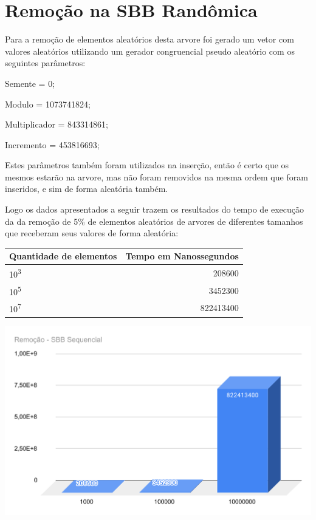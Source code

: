 \section{Remoção na SBB Randômica}

Para a remoção de elementos aleatórios desta arvore foi gerado um vetor com valores aleatórios utilizando um gerador congruencial pseudo aleatório com os seguintes parâmetros:
        \begin{center}
        Semente = 0;
       
        Modulo = 1073741824;
       
        Multiplicador = 843314861;
       
        Incremento = 453816693;
        \end{center}

Estes parâmetros também foram utilizados na inserção, então é certo que os mesmos estarão na arvore, mas não foram removidos na mesma ordem que foram inseridos, e sim de forma aleatória também.

Logo os dados apresentados a seguir trazem os resultados do tempo de execução da da remoção de 5\% de elementos aleatórios de arvores de diferentes tamanhos que receberam seus valores de forma aleatória:

\begin{center}
        \begin{tabular}{| l | r |}
            \hline
            Quantidade de elementos & Tempo em Nanossegundos\\
            \hline
            10\textsuperscript{3} & 208600\\
            10\textsuperscript{5} & 3452300\\
            10\textsuperscript{7} & 822413400\\
            \hline
        \end{tabular}
    \end{center}
    
    \begin{center}
            \includegraphics[scale=0.8]{Trabalho AED/fig/chart (1).pdf}
            \label{fig:Grafico 2}
    \end{center}
    
